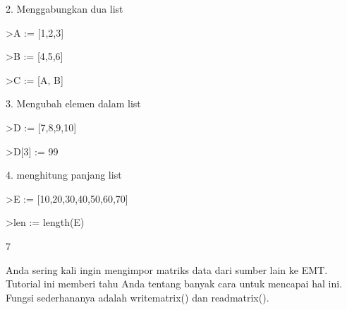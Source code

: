 \documentclass{article}
\begin{document}
\begin{eulernotebook}
\begin{eulercomment}
\begin{eulercomment}
\begin{eulercomment}
\begin{eulercomment}
\begin{eulercomment}
\begin{eulercomment}
\begin{eulercomment}
\begin{eulercomment}
\begin{eulercomment}
\begin{eulercomment}
\begin{eulercomment}
\begin{eulercomment}
\begin{eulercomment}
2. Menggabungkan dua list
\end{eulercomment}
\begin{eulerprompt}
>A := [1,2,3]
\end{eulerprompt}
\begin{euleroutput}
  [1,  2,  3]
\end{euleroutput}
\begin{eulerprompt}
>B := [4,5,6]
\end{eulerprompt}
\begin{euleroutput}
  [4,  5,  6]
\end{euleroutput}
\begin{eulerprompt}
>C := [A, B]
\end{eulerprompt}
\begin{euleroutput}
  [1,  2,  3,  4,  5,  6]
\end{euleroutput}
\begin{eulercomment}
3. Mengubah elemen dalam list
\end{eulercomment}
\begin{eulerprompt}
>D := [7,8,9,10]
\end{eulerprompt}
\begin{euleroutput}
  [7,  8,  9,  10]
\end{euleroutput}
\begin{eulerprompt}
>D[3] := 99
\end{eulerprompt}
\begin{euleroutput}
  [7,  8,  99,  10]
\end{euleroutput}
\begin{eulercomment}
4. menghitung panjang list
\end{eulercomment}
\begin{eulerprompt}
>E := [10,20,30,40,50,60,70]
\end{eulerprompt}
\begin{euleroutput}
  [10,  20,  30,  40,  50,  60,  70]
\end{euleroutput}
\begin{eulerprompt}
>len := length(E)
\end{eulerprompt}
\begin{euleroutput}
  7
\end{euleroutput}
\begin{eulercomment}
\begin{eulercomment}
\begin{eulercomment}
Anda sering kali ingin mengimpor matriks data dari sumber lain ke EMT.
Tutorial ini memberi tahu Anda tentang banyak cara untuk mencapai hal
ini. Fungsi sederhananya adalah writematrix() dan readmatrix().


\end{eulercomment}
\end{eulercomment}
\end{eulercomment}
\end{eulercomment}
\end{eulercomment}
\end{eulercomment}
\end{eulercomment}
\end{eulercomment}
\end{eulercomment}
\end{eulercomment}
\end{eulercomment}
\end{eulercomment}
\end{eulercomment}
\end{eulercomment}
\end{eulercomment}
\end{eulernotebook}
\end{document}

